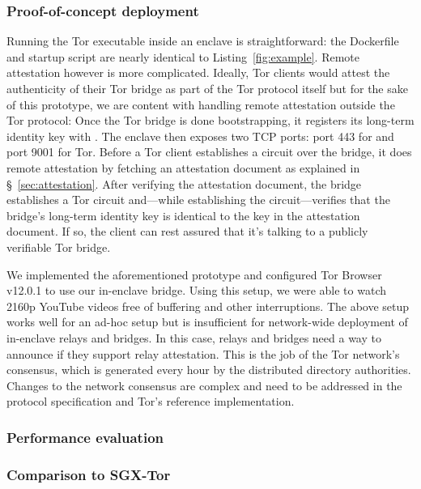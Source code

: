 \subsubsection{Proof-of-concept deployment}

Running the Tor executable inside an enclave is straightforward: the Dockerfile
and startup script are nearly identical to Listing~\ref{fig:example}.  Remote
attestation however is more complicated.  Ideally, Tor clients would attest the
authenticity of their Tor bridge as part of the Tor protocol itself but for the
sake of this prototype, we are content with handling remote attestation outside
the Tor protocol: Once the Tor bridge is done bootstrapping, it registers
its long-term identity key with \tool{}.  The enclave then exposes two TCP
ports: port 443 for \tool{} and port 9001 for Tor.  Before a Tor client
establishes a circuit over the bridge, it does remote attestation by fetching
an attestation document as explained in \S~\ref{sec:attestation}.  After
verifying the attestation document, the bridge establishes a Tor circuit
and---while establishing the circuit---verifies that the bridge's long-term
identity key is identical to the key in the attestation document.  If so, the
client can rest assured that it's talking to a publicly verifiable Tor bridge.

We implemented the aforementioned prototype and configured Tor Browser v12.0.1
to use our in-enclave bridge.  Using this setup, we were able to watch 2160p
YouTube videos free of buffering and other interruptions.
%
The above setup works well for an ad-hoc setup but is insufficient for
network-wide deployment of in-enclave relays and bridges.  In this case, relays
and bridges need a way to announce if they support relay attestation.  This is
the job of the Tor network's consensus, which is generated every hour by the
distributed directory authorities.  Changes to the network consensus are
complex and need to be addressed in the protocol specification and Tor's
reference implementation.

\subsubsection{Performance evaluation}


\subsubsection{Comparison to SGX-Tor}

